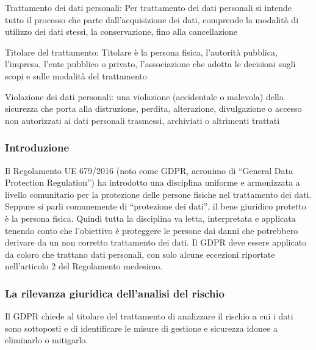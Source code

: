 Trattamento dei dati personali: Per trattamento dei dati personali si intende tutto il processo che parte dall’acquisizione dei dati, comprende la modalità di utilizzo dei dati stessi, la conservazione, fino alla cancellazione 

Titolare del trattamento: Titolare è la persona fisica, l'autorità pubblica, l'impresa, l'ente pubblico o privato, l'associazione che adotta le decisioni sugli scopi e sulle modalità del trattamento

Violazione dei dati personali:  una violazione (accidentale o malevola) della sicurezza che porta alla distruzione, perdita, alterazione, divulgazione o accesso non autorizzati ai dati personali trasmessi, archiviati o altrimenti trattati
\subsubsection{Introduzione}
\cite{gdpr}
\cite{gdpr2}
Il Regolamento UE 679/2016 (noto come GDPR, acronimo di “General Data Protection Regulation”) ha introdotto una disciplina uniforme e armonizzata a livello comunitario per la protezione delle persone fisiche nel trattamento dei dati.
Seppure si parli comunemente di “protezione dei dati”, il bene giuridico protetto è la
persona fisica. Quindi tutta la disciplina va letta, interpretata e applicata tenendo conto
che l’obiettivo è proteggere le persone dai danni che potrebbero derivare da un non corretto trattamento dei dati.
Il GDPR deve essere applicato da coloro che trattano dati personali, con solo alcune
eccezioni riportate nell’articolo 2 del Regolamento medesimo.
\subsubsection{La rilevanza giuridica dell’analisi del rischio}
Il GDPR chiede al titolare del trattamento di analizzare il rischio a cui i dati sono sottoposti e di identificare le misure di gestione e sicurezza idonee a eliminarlo o mitigarlo.
